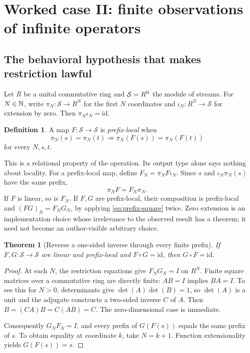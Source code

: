\documentclass[11pt,letterpaper]{article}
\newcommand{\id}{\mathrm{id}}
\newtheorem{theorem}[proposition]{Theorem}
\theoremstyle{definition}\newtheorem{definition}[proposition]{Definition}
\theoremstyle{remark}\newtheorem{remark}[proposition]{Remark}
\begin{document}
\section{Worked case II: finite observations of infinite operators}\label{sec:prefix}

\subsection{The behavioral hypothesis that makes restriction lawful}
Let $R$ be a unital commutative ring and $\mathcal S=R^{\mathbb N}$ the module of
streams. For $N\in\mathbb N$, write $\pi_N:\mathcal S\to R^N$ for the first $N$
coordinates and $\iota_N:R^N\to\mathcal S$ for extension by zero.
Then $\pi_N\iota_N=\id$.

\begin{definition}
A map $F:\mathcal S\to\mathcal S$ is \emph{prefix-local} when
\[
 \pi_N(s)=\pi_N(t)\Longrightarrow\pi_N(F(s))=\pi_N(F(t))
\]
for every $N,s,t$.
\end{definition}
This is a relational property of the operation. Its output type alone says
nothing about locality. For a prefix-local map, define
$F_N=\pi_N F\iota_N$. Since $s$ and $\iota_N\pi_N(s)$ have the same prefix,
\begin{equation}\label{eq:prefix-square}
 \pi_N F=F_N\pi_N.
\end{equation}
If $F$ is linear, so is $F_N$. If $F,G$ are prefix-local, their composition is
prefix-local and $(FG)_N=F_NG_N$, by applying \eqref{eq:prefix-square} twice.
Zero extension is an implementation choice whose irrelevance to the observed
result has a theorem; it need not become an author-visible arbitrary choice.

\begin{theorem}[Reverse a one-sided inverse through every finite prefix]
If $F,G:\mathcal S\to\mathcal S$ are linear and prefix-local and
$F\circ G=\id$, then $G\circ F=\id$.
\end{theorem}
\begin{proof}
At each $N$, the restriction equations give $F_NG_N=I$ on $R^N$.
Finite square matrices over a commutative ring are directly finite: $AB=I$
implies $BA=I$. To see this for $N>0$, determinants give
$\det(A)\det(B)=1$, so $\det(A)$ is a unit and the adjugate constructs a
two-sided inverse $C$ of $A$. Then $B=(CA)B=C(AB)=C$. The zero-dimensional
case is immediate.

Consequently $G_NF_N=I$, and every prefix of $G(F(s))$ equals the same prefix
of $s$. To obtain equality at coordinate $k$, take $N=k+1$. Function
extensionality yields $G(F(s))=s$.
\end{proof}
\end{document}
